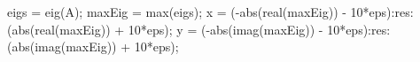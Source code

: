 eigs = eig(A);
maxEig = max(eigs);
x = (-abs(real(maxEig)) - 10*eps):res:(abs(real(maxEig)) + 10*eps);
y = (-abs(imag(maxEig)) - 10*eps):res:(abs(imag(maxEig)) + 10*eps);
